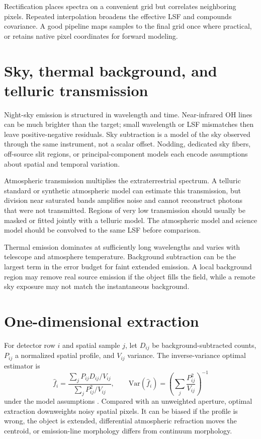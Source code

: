 Rectification places spectra on a convenient grid but correlates neighboring pixels.
Repeated interpolation broadens the effective LSF and compounds covariance.  A good
pipeline maps samples to the final grid once where practical, or retains native pixel
coordinates for forward modeling.

\section{Sky, thermal background, and telluric transmission}

Night-sky emission is structured in wavelength and time.  Near-infrared OH lines can
be much brighter than the target; small wavelength or LSF mismatches then leave
positive-negative residuals.  Sky subtraction is a model of the sky observed through
the same instrument, not a scalar offset.  Nodding, dedicated sky fibers, off-source
slit regions, or principal-component models each encode assumptions about spatial and
temporal variation.

Atmospheric transmission multiplies the extraterrestrial spectrum.  A telluric
standard or synthetic atmospheric model can estimate this transmission, but division
near saturated bands amplifies noise and cannot reconstruct photons that were not
transmitted.  Regions of very low transmission should usually be masked or fitted
jointly with a telluric model.  The atmospheric model and science model should be
convolved to the same LSF before comparison.

Thermal emission dominates at sufficiently long wavelengths and varies with telescope
and atmosphere temperature.  Background subtraction can be the largest term in the
error budget for faint extended emission.  A local background region may remove real
source emission if the object fills the field, while a remote sky exposure may not
match the instantaneous background.

\section{One-dimensional extraction}

For detector row $i$ and spatial sample $j$, let $D_{ij}$ be background-subtracted
counts, $P_{ij}$ a normalized spatial profile, and $V_{ij}$ variance.  The
inverse-variance optimal estimator is
\begin{equation}
 \widehat{f}_i=\frac{\sum_j P_{ij}D_{ij}/V_{ij}}
                       {\sum_jP_{ij}^2/V_{ij}},
 \qquad
 \mathrm{Var}(\widehat{f}_i)=
 \left(\sum_j\frac{P_{ij}^2}{V_{ij}}\right)^{-1}
 \label{eq:optimal-extraction}
\end{equation}
under the model assumptions \citep{Horne1986}.  Compared with an unweighted aperture,
optimal extraction downweights noisy spatial pixels.  It can be biased if the profile
is wrong, the object is extended, differential atmospheric refraction moves the
centroid, or emission-line morphology differs from continuum morphology.

